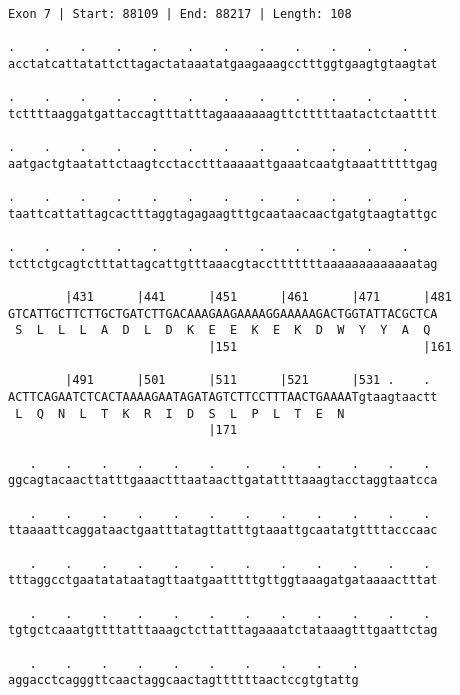 \documentclass{article}
\begin{document}
\newpage
\begin{Verbatim}[fontfamily=courier]
Exon 7 | Start: 88109 | End: 88217 | Length: 108

.    .    .    .    .    .    .    .    .    .    .    .    
acctatcattatattcttagactataaatatgaagaaagcctttggtgaagtgtaagtat

.    .    .    .    .    .    .    .    .    .    .    .    
tcttttaaggatgattaccagtttatttagaaaaaaagttctttttaatactctaatttt

.    .    .    .    .    .    .    .    .    .    .    .    
aatgactgtaatattctaagtcctacctttaaaaattgaaatcaatgtaaattttttgag

.    .    .    .    .    .    .    .    .    .    .    .    
taattcattattagcactttaggtagagaagtttgcaataacaactgatgtaagtattgc

.    .    .    .    .    .    .    .    .    .    .    .    
tcttctgcagtctttattagcattgtttaaacgtacctttttttaaaaaaaaaaaaatag

        |431      |441      |451      |461      |471      |481
GTCATTGCTTCTTGCTGATCTTGACAAAGAAGAAAAGGAAAAAGACTGGTATTACGCTCA
 S  L  L  L  A  D  L  D  K  E  E  K  E  K  D  W  Y  Y  A  Q 
                            |151                          |161

        |491      |501      |511      |521      |531 .    . 
ACTTCAGAATCTCACTAAAAGAATAGATAGTCTTCCTTTAACTGAAAATgtaagtaactt
 L  Q  N  L  T  K  R  I  D  S  L  P  L  T  E  N             
                            |171                            

   .    .    .    .    .    .    .    .    .    .    .    . 
ggcagtacaacttatttgaaactttaataacttgatattttaaagtacctaggtaatcca

   .    .    .    .    .    .    .    .    .    .    .    . 
ttaaaattcaggataactgaatttatagttatttgtaaattgcaatatgttttacccaac

   .    .    .    .    .    .    .    .    .    .    .    . 
tttaggcctgaatatataatagttaatgaatttttgttggtaaagatgataaaactttat

   .    .    .    .    .    .    .    .    .    .    .    . 
tgtgctcaaatgttttatttaaagctcttatttagaaaatctataaagtttgaattctag

   .    .    .    .    .    .    .    .    .    .
aggacctcagggttcaactaggcaactagttttttaactccgtgtattg
\end{Verbatim}
\newpage
\end{document}
